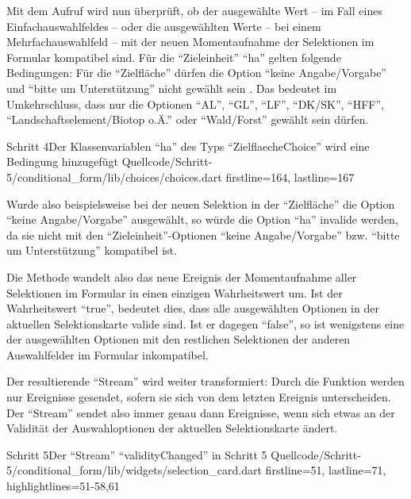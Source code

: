 Mit dem Aufruf  wird nun überprüft, ob der ausgewählte Wert
-- im Fall eines Einfachauswahlfeldes --
oder die ausgewählten Werte
-- bei einem Mehrfachauswahlfeld --
mit der neuen Momentaufnahme der Selektionen im Formular kompatibel sind.
Für die \enquote{Zieleinheit} \enquote{ha} gelten folgende Bedingungen:
Für die \enquote{Zielfläche} dürfen die Option \enquote{keine Angabe/Vorgabe} und
\enquote{bitte um Unterstützung} nicht gewählt sein .
Das bedeutet im Umkehrschluss,
dass nur die Optionen \enquote{AL},
\enquote{GL},
\enquote{LF},
\enquote{DK/SK},
\enquote{HFF},
\enquote{Landschaftselement/Biotop o.Ä.} 
oder \enquote{Wald/Forst} gewählt sein dürfen. 

\begin{alexlisting}{Schritt 4}{Der Klassenvariablen \enquote{ha} des Typs \enquote{ZielflaecheChoice} wird eine Bedingung hinzugefügt}
  {Quellcode/Schritt-5/conditional_form/lib/choices/choices.dart}
  {firstline=164, lastline=167}
  \label{lst:Schritt5ha}
\end{alexlisting}

Wurde also beispielsweise bei der neuen Selektion in der \enquote{Zielfläche} die Option \enquote{keine Angabe/Vorgabe} ausgewählt,
so würde die Option \enquote{ha} invalide werden,
da sie nicht mit den \enquote{Zieleinheit}-Optionen \enquote{keine Angabe/Vorgabe} bzw. \enquote{bitte um Unterstützung}  kompatibel ist.

Die Methode   wandelt also das neue Ereignis der Momentaufnahme aller Selektionen im Formular in einen einzigen Wahrheitswert um.
Ist der Wahrheitswert \enquote{true},
bedeutet dies,
dass alle ausgewählten Optionen in der aktuellen Selektionskarte valide sind.
Ist er dagegen \enquote{false}, so ist wenigstens eine der ausgewählten Optionen mit den restlichen Selektionen der anderen Auswahlfelder im Formular inkompatibel.



Der resultierende \enquote{Stream} wird weiter transformiert: Durch die Funktion   werden nur Ereignisse gesendet,
sofern sie sich von dem letzten Ereignis unterscheiden.
Der \enquote{Stream}  sendet also immer genau dann Ereignisse,
wenn sich etwas an der Validität der Auswahloptionen der aktuellen Selektionskarte ändert.

\begin{alexlisting}{Schritt 5}{Der \enquote{Stream} \enquote{validityChanged} in Schritt 5}
  {Quellcode/Schritt-5/conditional_form/lib/widgets/selection_card.dart}
  {firstline=51, lastline=71, highlightlines={51-58,61}}
  \label{lst:Schritt5needsRepaint}
\end{alexlisting} 

